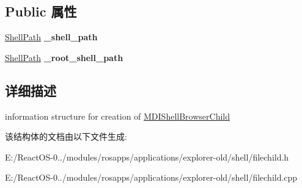 \subsection*{Public 属性}
\begin{DoxyCompactItemize}
\item 
\mbox{\label{struct_shell_child_wnd_info_ad23b482b28d032a550ad69bf542d70e9}} 
\hyperlink{struct_shell_path}{Shell\+Path} {\bfseries \+\_\+shell\+\_\+path}
\item 
\mbox{\label{struct_shell_child_wnd_info_a5629dbdf728da0a010a1383699b764ac}} 
\hyperlink{struct_shell_path}{Shell\+Path} {\bfseries \+\_\+root\+\_\+shell\+\_\+path}
\end{DoxyCompactItemize}


\subsection{详细描述}
information structure for creation of \hyperlink{struct_m_d_i_shell_browser_child}{M\+D\+I\+Shell\+Browser\+Child} 

该结构体的文档由以下文件生成\+:\begin{DoxyCompactItemize}
\item 
E\+:/\+React\+O\+S-\/0../modules/rosapps/applications/explorer-\/old/shell/filechild.\+h\item 
E\+:/\+React\+O\+S-\/0../modules/rosapps/applications/explorer-\/old/shell/filechild.\+cpp\end{DoxyCompactItemize}
